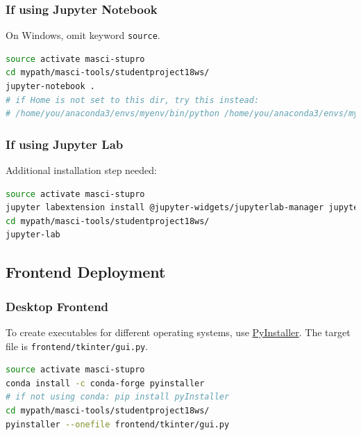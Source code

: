 \subsubsection{If using Jupyter
  Notebook}\label{if-using-jupyter-notebook}

On Windows, omit keyword \texttt{source}.

\begin{lstlisting}[language=bash, style=code]
source activate masci-stupro
cd mypath/masci-tools/studentproject18ws/
jupyter-notebook .
# if Home is not set to this dir, try this instead:
# /home/you/anaconda3/envs/myenv/bin/python /home/you/anaconda3/envs/myenv/bin/jupyter-notebook .
\end{lstlisting}

\subsubsection{If using Jupyter Lab}\label{if-using-jupyter-lab}

Additional installation step needed:

\begin{lstlisting}[language=bash, style=code]
source activate masci-stupro
jupyter labextension install @jupyter-widgets/jupyterlab-manager jupyter-matplotlib ipyvolume
cd mypath/masci-tools/studentproject18ws/
jupyter-lab
\end{lstlisting}

\subsection{Frontend Deployment}\label{frontend-deployment}

\subsubsection{Desktop Frontend}\label{desktop-frontend-1}

To create executables for different operating systems, use
\href{https://www.pyinstaller.org/}{PyInstaller}. The target file is
\texttt{frontend/tkinter/gui.py}.

\begin{lstlisting}[language=bash, style=code]
source activate masci-stupro
conda install -c conda-forge pyinstaller
# if not using conda: pip install pyInstaller
cd mypath/masci-tools/studentproject18ws/
pyinstaller --onefile frontend/tkinter/gui.py
\end{lstlisting}

